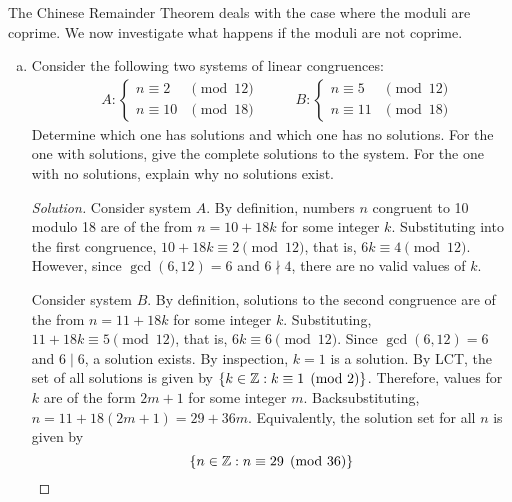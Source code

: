 \question The Chinese Remainder Theorem deals with the case where the moduli are coprime.
We now investigate what happens if the moduli are not coprime.
\begin{enumerate}[(a)]
  \item Consider the following two systems of linear congruences:
        \begin{align*}
           & A : \begin{cases}
            n \equiv 2  & \pmod{12} \\
            n \equiv 10 & \pmod{18}
          \end{cases}
           & \quad                          &
          B : \begin{cases}
            n \equiv 5  & \pmod{12} \\
            n \equiv 11 & \pmod{18}
          \end{cases}
        \end{align*}
        Determine which one has solutions and which one has no solutions.
        For the one with solutions, give the complete solutions to the system.
        For the one with no solutions, explain why no solutions exist.
        \begin{proof}[Solution]
          Consider system $A$.
          By definition, numbers $n$ congruent to 10 modulo 18 are of the from
          $n = 10 + 18k$ for some integer $k$.
          Substituting into the first congruence,
          $10 + 18k \equiv 2 \pmod{12}$, that is, $6k \equiv 4 \pmod{12}$.
          However, since $\gcd(6,12)=6$ and $6 \nmid 4$, there are no valid values of $k$.

          Consider system $B$.
          By definition, solutions to the second congruence are of the from
          $n = 11 + 18k$ for some integer $k$.
          Substituting, $11 + 18k \equiv 5 \pmod{12}$, that is, $6k \equiv 6 \pmod{12}$.
          Since $\gcd(6,12) = 6$ and $6 \mid 6$, a solution exists.
          By inspection, $k=1$ is a solution.
          By LCT, the set of all solutions is given by $\{ k \in \mathbb{Z} : k \equiv 1 \pmod{2} \}$.
          Therefore, values for $k$ are of the form $2m+1$ for some integer $m$.
          Backsubstituting, $n = 11 + 18(2m+1) = 29 + 36m$.
          Equivalently, the solution set for all $n$ is given by
          \[ \{ n\in\mathbb{Z} : n \equiv 29 \pmod{36} \} \qedhere \]
        \end{proof}


\end{enumerate}
